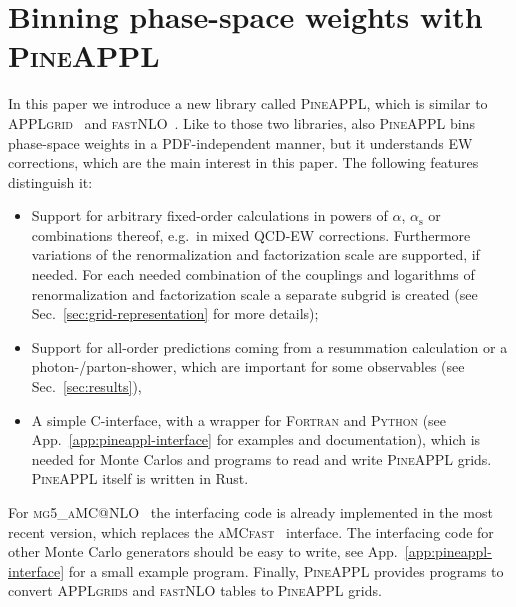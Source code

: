 \section{Binning phase-space weights with 
\texorpdfstring{\textsc{PineAPPL}}{PineAPPL}}
\label{sec:pineappl}

In this paper we introduce a new library called \textsc{PineAPPL}, which is similar to \textsc{APPLgrid}~\cite{Carli:2010rw} and \textsc{fastNLO}~\cite{Kluge:2006xs,Wobisch:2011ij,Britzger:2012bs}.
Like to those two libraries, also \textsc{PineAPPL} bins phase-space weights in a PDF-independent manner, but it understands EW corrections, which are the main interest in this paper.
The following features distinguish it:
\begin{itemize}
\item Support for arbitrary fixed-order calculations in powers of $\alpha$, $\alpha_\mathrm{s}$ or combinations thereof, e.g.\ in mixed QCD-EW corrections.
Furthermore variations of the renormalization and factorization scale are supported, if needed.
For each needed combination of the couplings and logarithms of renormalization and factorization scale a separate subgrid is created (see Sec.~\ref{sec:grid-representation} for more details);
\item Support for all-order predictions coming from a resummation calculation or a photon-/parton-shower, which are important for some observables (see Sec.~\ref{sec:results}),
\item A simple \textsc{C}-interface, with a wrapper for \textsc{Fortran} and \textsc{Python} (see App.~\ref{app:pineappl-interface} for examples and documentation), which is needed for Monte Carlos and programs to read and write \textsc{PineAPPL} grids.
\textsc{PineAPPL} itself is written in Rust.
\end{itemize}
For \textsc{mg5\_aMC@NLO}~\cite{Alwall:2014hca,Frederix:2018nkq} the interfacing code is already implemented in the most recent version, which replaces the \textsc{aMCfast}~\cite{Bertone:2014zva} interface.
The interfacing code for other Monte Carlo generators should be easy to write, see App.~\ref{app:pineappl-interface} for a small example program.
Finally, \textsc{PineAPPL} provides programs to convert \textsc{APPLgrids} and \textsc{fastNLO} tables to \textsc{PineAPPL} grids.

